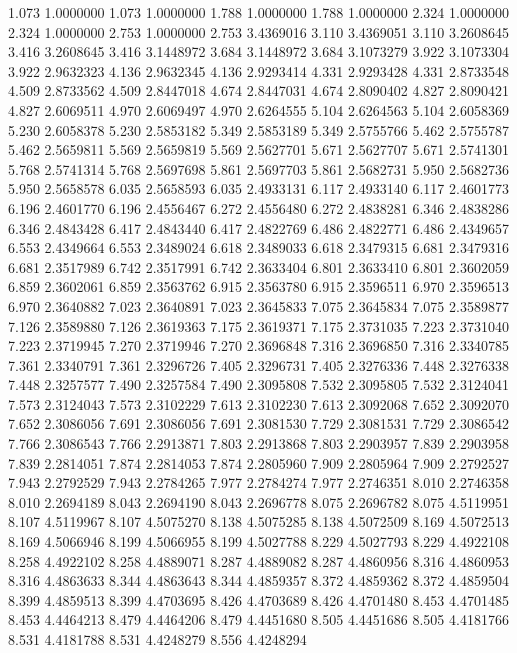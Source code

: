 1.073 1.0000000
1.073 1.0000000
1.788 1.0000000
1.788 1.0000000
2.324 1.0000000
2.324 1.0000000
2.753 1.0000000
2.753 3.4369016
3.110 3.4369051
3.110 3.2608645
3.416 3.2608645
3.416 3.1448972
3.684 3.1448972
3.684 3.1073279
3.922 3.1073304
3.922 2.9632323
4.136 2.9632345
4.136 2.9293414
4.331 2.9293428
4.331 2.8733548
4.509 2.8733562
4.509 2.8447018
4.674 2.8447031
4.674 2.8090402
4.827 2.8090421
4.827 2.6069511
4.970 2.6069497
4.970 2.6264555
5.104 2.6264563
5.104 2.6058369
5.230 2.6058378
5.230 2.5853182
5.349 2.5853189
5.349 2.5755766
5.462 2.5755787
5.462 2.5659811
5.569 2.5659819
5.569 2.5627701
5.671 2.5627707
5.671 2.5741301
5.768 2.5741314
5.768 2.5697698
5.861 2.5697703
5.861 2.5682731
5.950 2.5682736
5.950 2.5658578
6.035 2.5658593
6.035 2.4933131
6.117 2.4933140
6.117 2.4601773
6.196 2.4601770
6.196 2.4556467
6.272 2.4556480
6.272 2.4838281
6.346 2.4838286
6.346 2.4843428
6.417 2.4843440
6.417 2.4822769
6.486 2.4822771
6.486 2.4349657
6.553 2.4349664
6.553 2.3489024
6.618 2.3489033
6.618 2.3479315
6.681 2.3479316
6.681 2.3517989
6.742 2.3517991
6.742 2.3633404
6.801 2.3633410
6.801 2.3602059
6.859 2.3602061
6.859 2.3563762
6.915 2.3563780
6.915 2.3596511
6.970 2.3596513
6.970 2.3640882
7.023 2.3640891
7.023 2.3645833
7.075 2.3645834
7.075 2.3589877
7.126 2.3589880
7.126 2.3619363
7.175 2.3619371
7.175 2.3731035
7.223 2.3731040
7.223 2.3719945
7.270 2.3719946
7.270 2.3696848
7.316 2.3696850
7.316 2.3340785
7.361 2.3340791
7.361 2.3296726
7.405 2.3296731
7.405 2.3276336
7.448 2.3276338
7.448 2.3257577
7.490 2.3257584
7.490 2.3095808
7.532 2.3095805
7.532 2.3124041
7.573 2.3124043
7.573 2.3102229
7.613 2.3102230
7.613 2.3092068
7.652 2.3092070
7.652 2.3086056
7.691 2.3086056
7.691 2.3081530
7.729 2.3081531
7.729 2.3086542
7.766 2.3086543
7.766 2.2913871
7.803 2.2913868
7.803 2.2903957
7.839 2.2903958
7.839 2.2814051
7.874 2.2814053
7.874 2.2805960
7.909 2.2805964
7.909 2.2792527
7.943 2.2792529
7.943 2.2784265
7.977 2.2784274
7.977 2.2746351
8.010 2.2746358
8.010 2.2694189
8.043 2.2694190
8.043 2.2696778
8.075 2.2696782
8.075 4.5119951
8.107 4.5119967
8.107 4.5075270
8.138 4.5075285
8.138 4.5072509
8.169 4.5072513
8.169 4.5066946
8.199 4.5066955
8.199 4.5027788
8.229 4.5027793
8.229 4.4922108
8.258 4.4922102
8.258 4.4889071
8.287 4.4889082
8.287 4.4860956
8.316 4.4860953
8.316 4.4863633
8.344 4.4863643
8.344 4.4859357
8.372 4.4859362
8.372 4.4859504
8.399 4.4859513
8.399 4.4703695
8.426 4.4703689
8.426 4.4701480
8.453 4.4701485
8.453 4.4464213
8.479 4.4464206
8.479 4.4451680
8.505 4.4451686
8.505 4.4181766
8.531 4.4181788
8.531 4.4248279
8.556 4.4248294
